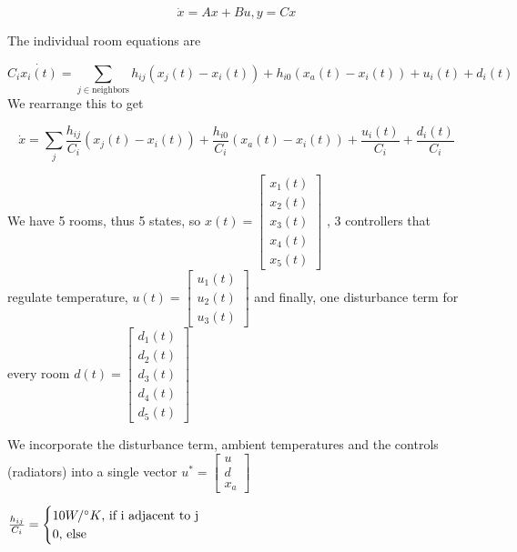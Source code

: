 \documentclass[12pt,A4, onecolumn]{exam}
\begin{document}
\begin{questions}
\begin{solution}
\begin{parts}
    \[
        \dot{x} =Ax+Bu, y = Cx
    \]

    The individual room equations are 

    \[
        C_i \dot{x_i(t)} = \sum_{ j \in \text{neighbors}  }^{ } h_{ij} \left(   x_j(t) - x_i(t) \right) + h_{i0} \left( x_a(t) - x_i(t) \right) + u_i(t) + d_i(t)
    \]
    We rearrange this to get 

    \[
        \dot{x} = \sum_{ j }^{  } \frac{ h_{ij} }{ C_i } \left(   x_j(t) - x_i(t) \right) + \frac{ h_{i0} }{ C_i } \left( x_a(t) - x_i(t) \right) + \frac{ u_i(t) }{ C_i } + \frac{ d_i(t) }{ C_i }
    \]
    
    

    We have 5 rooms, thus 5 states, so 
    $ x(t) = \begin{bmatrix}
            x_1(t)\\
            x_2(t)\\
            x_3(t)\\
            x_4(t)\\
            x_5(t)
        \end{bmatrix}   $
    , 3 controllers that regulate temperature, $ u(t)= \begin{bmatrix}
        u_1(t)\\
        u_2(t)\\
        u_3(t)
    \end{bmatrix}  $ and finally, one disturbance term for every room $d(t) = \begin{bmatrix}
            d_1(t)\\
            d_2(t)\\
            d_3(t)\\
            d_4(t)\\
            d_5(t)
        \end{bmatrix}$

    We incorporate the disturbance term, ambient temperatures and the controls (radiators) into a single vector $ u^* = \begin{bmatrix}
        u\\
        d\\
        x_a
    \end{bmatrix}  $ 
    
    $ \frac{ h_{ij} }{ C_i } = \begin{cases}
      10 W/\degree K\text{, if i adjacent to j}\\
      0\text{, else}
    \end{cases} $ 
    

\end{parts}
\end{solution}
\end{questions}
\end{document}
